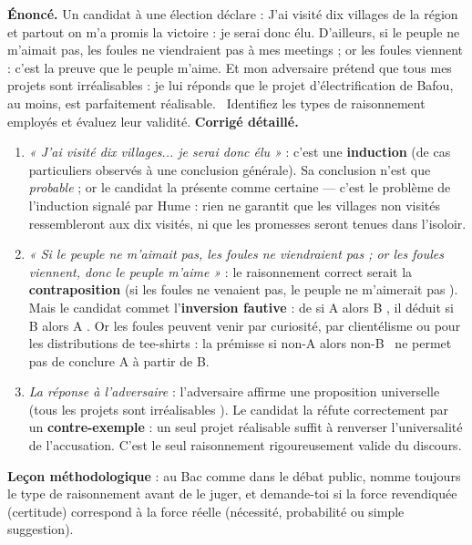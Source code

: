 \documentclass[11pt]{article}
\begin{document}
\begin{exoresolu}
\textbf{Énoncé.} Un candidat à une élection déclare : \guillemotleft J'ai visité dix villages de la région et partout on m'a promis la victoire : je serai donc élu. D'ailleurs, si le peuple ne m'aimait pas, les foules ne viendraient pas à mes meetings ; or les foules viennent : c'est la preuve que le peuple m'aime. Et mon adversaire prétend que tous mes projets sont irréalisables : je lui réponds que le projet d'électrification de Bafou, au moins, est parfaitement réalisable. \guillemotright\ Identifiez les types de raisonnement employés et évaluez leur validité.
\tcblower
\textbf{Corrigé détaillé.}
\begin{enumerate}
\item \emph{« J'ai visité dix villages... je serai donc élu »} : c'est une \textbf{induction} (de cas particuliers observés à une conclusion générale). Sa conclusion n'est que \emph{probable} ; or le candidat la présente comme certaine — c'est le problème de l'induction signalé par Hume : rien ne garantit que les villages non visités ressembleront aux dix visités, ni que les promesses seront tenues dans l'isoloir.
\item \emph{« Si le peuple ne m'aimait pas, les foules ne viendraient pas ; or les foules viennent, donc le peuple m'aime »} : le raisonnement correct serait la \textbf{contraposition} (\guillemotleft si les foules ne venaient pas, le peuple ne m'aimerait pas \guillemotright). Mais le candidat commet l'\textbf{inversion fautive} : de \guillemotleft si A alors B \guillemotright, il déduit \guillemotleft si B alors A \guillemotright. Or les foules peuvent venir par curiosité, par clientélisme ou pour les distributions de tee-shirts : la prémisse \guillemotleft si non-A alors non-B \guillemotright\ ne permet pas de conclure A à partir de B.
\item \emph{La réponse à l'adversaire} : l'adversaire affirme une proposition universelle (\guillemotleft tous les projets sont irréalisables \guillemotright). Le candidat la réfute correctement par un \textbf{contre-exemple} : un seul projet réalisable suffit à renverser l'universalité de l'accusation. C'est le seul raisonnement rigoureusement valide du discours.
\end{enumerate}
\textbf{Leçon méthodologique} : au Bac comme dans le débat public, nomme toujours le type de raisonnement avant de le juger, et demande-toi si la force revendiquée (certitude) correspond à la force réelle (nécessité, probabilité ou simple suggestion).
\end{exoresolu}
\end{document}
